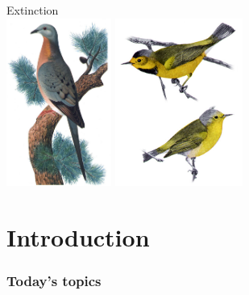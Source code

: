 \documentclass[color=usenames,dvipsnames]{beamer}\usepackage[]{graphicx}\usepackage[]{color}
\begin{document}
\begin{frame}[plain]
  \begin{center}
    {\Huge Extinction} \\
    \vfill
    \includegraphics[height=5.5cm,keepaspectratio]{figs/passenger-pigeon} \hspace{0.5cm}
    \includegraphics[height=5.5cm,keepaspectratio]{figs/Vermivora_bachmanii} %
  \end{center}
\end{frame}




\section{Introduction}


\begin{frame}[plain]
  \frametitle{Today's topics}
  \tableofcontents%
\end{frame}
\end{document}
